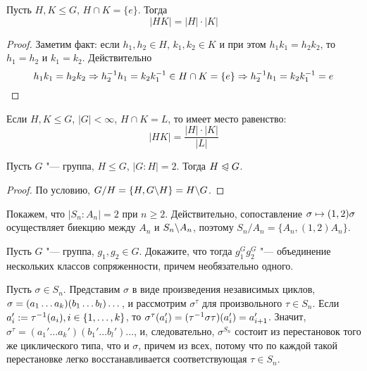 \begin{proposition}
	Пусть $H, K \le G$, $H \cap K = \{e\}$. Тогда
	\[
		|HK| = |H| \cdot |K|
	\]
\end{proposition}

\begin{proof}
	Заметим факт: если $h_1, h_2 \in H$, $k_1, k_2 \in K$ и при этом $h_1k_1 = h_2k_2$, то $h_1 = h_2$ и $k_1 = k_2$. Действительно
	\[
		h_1k_1 = h_2k_2 \Rightarrow h^{-1}_2h_1 = k_2k^{-1}_1 \in H \cap K = \{e\} \Rightarrow h^{-1}_2 h_1 = k_2 k^{-1}_1 = e
	\]
\end{proof}

\begin{exercise}
	Если $H, K \le G$, $|G| < \infty$, $H \cap K = L$, то имеет место равенство:
	\[
		|HK| = \frac{|H| \cdot |K|}{|L|}
	\]
\end{exercise}

\begin{proposition}
	Пусть $G$ "--- группа, $H \le G$, $|G : H| = 2$. Тогда $H \trianglelefteqslant G$.
\end{proposition}

\begin{proof}
	По условию, $G / H = \{H, G \backslash H\} = H \backslash G$.
\end{proof}

\begin{note}
	Покажем, что $|S_n : A_n| = 2$ при $n \ge 2$. Действительно, сопоставление $\sigma \hm\mapsto (1, 2)\sigma$ осуществляет биекцию между $A_n$ и $S_n \backslash A_n$, поэтому $S_n / A_n = \{A_n, (1, 2)A_n\}$.
\end{note}

\begin{exercise}
	Пусть $G$ "--- группа, $g_1, g_2 \in G$. Докажите, что тогда $g_1^Gg_2^G$ "--- объединение нескольких классов сопряженности, причем необязательно одного.
\end{exercise}

\begin{example}
	Пусть $\sigma \in S_n$. Представим $\sigma$ в виде произведения независимых циклов, $\sigma \hm= (a_1\dotsc a_k)(b_1\dotsc b_l)\dotsc$, и рассмотрим $\sigma^\tau$ для произвольного $\tau \in S_n$. Если $a_i' := \tau^{-1}(a_i), i \hm\in \{1, \dots, k\}$, то $\sigma^\tau(a_i') \hm= (\tau^{-1}\sigma\tau)(a_i') = a_{i + 1}'$. Значит, $\sigma^\tau = (a_1'\dotsc a_k')(b_1'\dotsc b_l')\dotsc$, и, следовательно, $\sigma^{S_n}$ состоит из перестановок того же циклического типа, что и $\sigma$, причем из всех, потому что по каждой такой перестановке легко восстанавливается соответствующая $\tau \in S_n$.
\end{example}